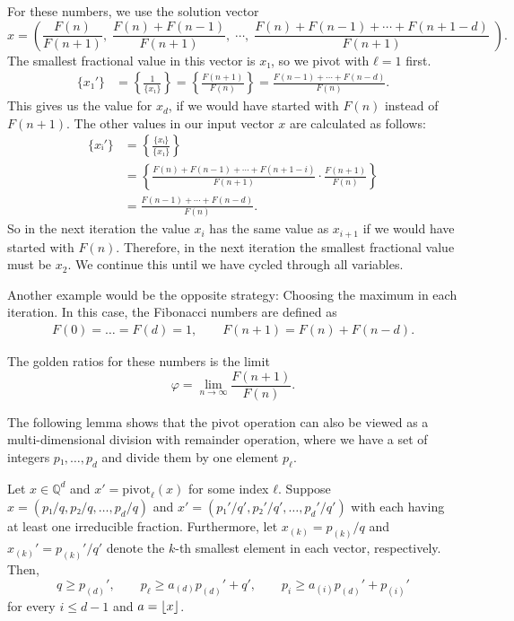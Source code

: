 For these numbers, we use the solution vector
\[
  x =
  \left(
    \frac{F(n)}{F(n + 1)},\;
    \frac{F(n) + F(n - 1)}{F(n + 1)},\;
    ⋯,\;
    \frac{F(n) + F(n - 1) + ⋯ + F(n + 1 - d)}{F(n + 1)}\;
  \right).
\]
The smallest fractional value in this vector is $x₁$, so we pivot with $ℓ = 1$ first.
\begin{align*}
  \{x₁'\}
  & = \left\{\frac{1}{\{x₁\}}\right\}
  = \left\{\frac{F(n + 1)}{F(n)}\right\}
  = \frac{F(n - 1) + ⋯ + F(n - d)}{F(n)}.
\end{align*}
This gives us the value for $x_d$, if we would have started with $F(n)$ instead of $F(n+1)$.
The other values in our input vector $x$ are calculated as follows:
\begin{align*}
  \{xᵢ'\}
  & = \left\{\frac{\{xᵢ\}}{\{x₁\}}\right\} \\
  & = \left\{\frac{F(n) + F(n - 1) + ⋯ + F(n + 1 - i)}{F(n + 1)} · \frac{F(n + 1)}{F(n)}\right\} \\
  & = \frac{F(n - 1) + ⋯ + F(n - d)}{F(n)}.
\end{align*}
So in the next iteration the value $x_i$ has the same value as $x_{i+1}$ if we
would have started with $F(n)$.
Therefore, in the next iteration the smallest fractional value must be $x_2$.
We continue this until we have cycled through all variables.

Another example would be the opposite strategy: Choosing the maximum in each iteration.
In this case, the Fibonacci numbers are defined as
\begin{align*}
  F(0) = \dots = F(d) = 1, \qquad F(n + 1) = F(n) + F(n - d).
\end{align*}

The golden ratios for these numbers is the limit
\[
  φ = \lim_{n → ∞} \frac{F(n + 1)}{F(n)}.
\]


The following lemma shows that the $\mathrm{pivot}$ operation can also be
viewed as a multi-dimensional division with remainder operation, where we have
a set of integers $p₁, …, p_d$ and divide them by one element $p_ℓ$.

\begin{lemma}
  \label{lem:divmod}
  Let $x ∈ ℚ^d$ and $x' = \mathrm{pivot}_ℓ(x)$ for some index $ℓ$.
  Suppose $x = (p₁/q, p₂/q, …, p_d/q)$ and $x' = (p₁'/q', p₂'/q', …, p_d'/q')$
  with each having at least one irreducible fraction.
  Furthermore, let $x_{(k)} = p_{(k)}/q$ and $x_{(k)}' = p_{(k)}'/q'$ denote
  the $k$-th smallest element in each vector, respectively.
  Then,
  \[
    q ≥ p_{(d)}',
    \qquad
    p_ℓ ≥ a_{(d)} p_{(d)}' + q',
    \qquad
    p_i ≥ a_{(i)} p_{(d)}' + p_{(i)}'
  \]
  for every $i ≤ d - 1$ and $a = \left\lfloor x\right\rfloor$.
\end{lemma}

